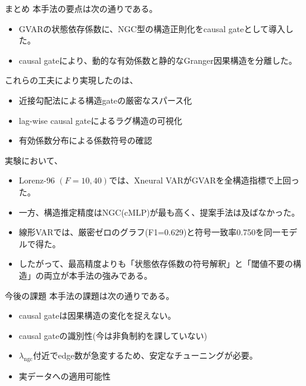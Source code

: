 \documentclass[dvipdfmx,11pt]{beamer}
\begin{document}
\begin{frame}{まとめ}
  \footnotesize
  本手法の要点は次の通りである。

  \begin{itemize}
    \item GVARの状態依存係数に、NGC型の構造正則化をcausal gateとして導入した。
    \item causal gateにより、動的な有効係数と静的なGranger因果構造を分離した。
  \end{itemize}

  \vspace{0.25em}
  これらの工夫により実現したのは、
  \begin{itemize}
    \item 近接勾配法による構造gateの厳密なスパース化
    \item lag-wise causal gateによるラグ構造の可視化
    \item 有効係数分布による係数符号の確認
  \end{itemize}

  \vspace{0.25em}
  実験において、
  \begin{itemize}
    \item Lorenz-96 $(F=10,40)$では、Xneural VARがGVARを全構造指標で上回った。
    \item 一方、構造推定精度はNGC(cMLP)が最も高く、提案手法は及ばなかった。
    \item 線形VARでは、厳密ゼロのグラフ(F1=0.629)と符号一致率0.750を同一モデルで得た。
    \item したがって、最高精度よりも「状態依存係数の符号解釈」と「閾値不要の構造」の両立が本手法の強みである。
  \end{itemize} 
\end{frame}

\begin{frame}{今後の課題}
  本手法の課題は次の通りである。

  \begin{itemize}
    \item causal gateは因果構造の変化を捉えない。
    \item causal gateの識別性(今は非負制約を課していない)
    \item $\lambda_{\mathrm{ngc}}$付近でedge数が急変するため、安定なチューニングが必要。
    \item 実データへの適用可能性
  \end{itemize}
\end{frame}
\end{document}
